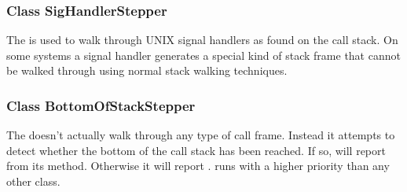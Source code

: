 \subsubsection{Class SigHandlerStepper}

The  is used to walk through UNIX signal handlers as found on
the call stack. On some systems a signal handler generates a special kind of
stack frame that cannot be walked through using normal stack walking techniques.

\subsubsection{Class BottomOfStackStepper}

The  doesn't actually walk through any type of call frame.
Instead it attempts to detect whether the bottom of the call stack has been
reached. If so,  will report  from its
 method. Otherwise it will report .
runs with a higher priority than any other  class.

